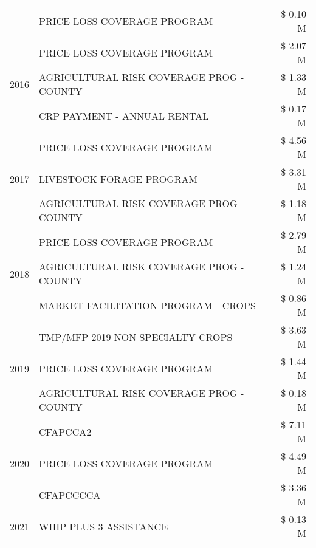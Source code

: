 \begin{tabular}{llr}
 & PRICE LOSS COVERAGE PROGRAM & \$ 0.10 M \\
\cline{1-3}
\multirow[t]{3}{*}{2016} & PRICE LOSS COVERAGE PROGRAM & \$ 2.07 M \\
 & AGRICULTURAL RISK COVERAGE PROG - COUNTY & \$ 1.33 M \\
 & CRP PAYMENT - ANNUAL RENTAL & \$ 0.17 M \\
\cline{1-3}
\multirow[t]{3}{*}{2017} & PRICE LOSS COVERAGE PROGRAM & \$ 4.56 M \\
 & LIVESTOCK FORAGE PROGRAM & \$ 3.31 M \\
 & AGRICULTURAL RISK COVERAGE PROG - COUNTY & \$ 1.18 M \\
\cline{1-3}
\multirow[t]{3}{*}{2018} & PRICE LOSS COVERAGE PROGRAM & \$ 2.79 M \\
 & AGRICULTURAL RISK COVERAGE PROG - COUNTY & \$ 1.24 M \\
 & MARKET FACILITATION PROGRAM - CROPS & \$ 0.86 M \\
\cline{1-3}
\multirow[t]{3}{*}{2019} & TMP/MFP 2019 NON SPECIALTY CROPS & \$ 3.63 M \\
 & PRICE LOSS COVERAGE PROGRAM & \$ 1.44 M \\
 & AGRICULTURAL RISK COVERAGE PROG - COUNTY & \$ 0.18 M \\
\cline{1-3}
\multirow[t]{3}{*}{2020} & CFAPCCA2 & \$ 7.11 M \\
 & PRICE LOSS COVERAGE PROGRAM & \$ 4.49 M \\
 & CFAPCCCCA & \$ 3.36 M \\
\cline{1-3}
2021 & WHIP PLUS 3 ASSISTANCE & \$ 0.13 M \\
\cline{1-3}
\bottomrule
\end{tabular}
